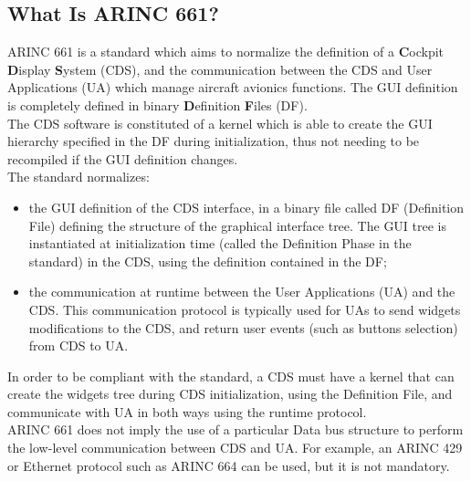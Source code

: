     \subsection{What Is ARINC 661?}
        ARINC 661 is a standard which aims to normalize the definition of a \textbf{C}ockpit \textbf{D}isplay \textbf{S}ystem (CDS), 
        and the communication between the CDS and User Applications (UA) which manage aircraft avionics functions. The GUI definition 
        is completely defined in binary \textbf{D}efinition \textbf{F}iles (DF).\\
        \vspace{3mm}
        The CDS software is constituted of a kernel which is able to create the GUI hierarchy specified in the DF during initialization, 
        thus not needing to be recompiled if the GUI definition changes. \\
        \vspace{3mm}
        The standard normalizes: 
        \begin{itemize}
            \item the GUI definition of the CDS interface, in a binary file called DF (Definition File) defining the structure of the 
            graphical interface tree. The GUI tree is instantiated at initialization time (called the Definition Phase in the standard) 
            in the CDS, using the definition contained in the DF;
            \item the communication at runtime between the User Applications (UA) and the CDS. This communication protocol is typically 
            used for UAs to send widgets modifications to the CDS, and return user events (such as buttons selection) from CDS to UA.
        \end{itemize}
        In order to be compliant with the standard, a CDS must have a kernel that can create the widgets tree during CDS initialization, 
        using the Definition File, and communicate with UA in both ways using the runtime protocol. \\ 
        \vspace{3mm}
        ARINC 661 does not imply the use of a particular Data bus structure to perform the low-level communication between CDS and UA. 
        For example, an ARINC 429 or Ethernet protocol such as ARINC 664 can be used, but it is not mandatory. \\ 
